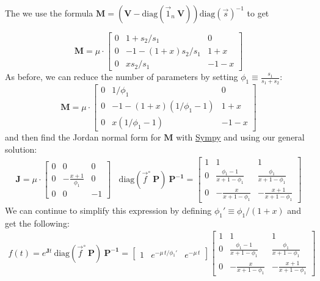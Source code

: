 \documentclass{article}
\newcommand{\finit}{\ensuremath{\vec{f}^\circ}}
\begin{document}
The we use the formula $\mathbf{M} = \left(\mathbf{V} - \text{diag}(\vec{1}_n~\mathbf{V})\right) \text{diag}(\vec{s})^{-1}$ to get

\[
\mathbf{M} = \mu \cdot 
    \begin{bmatrix}
        0 & 1 + s_2/s_1 & 0  \\
        0 & - 1 - (1+x) s_2 / s_1 & 1+x \\
        0 & x s_2 / s_1 & -1-x
    \end{bmatrix}
\]
As before, we can reduce the number of parameters by setting $\phi_1 \equiv \frac{s_1}{s_1+s_2}$:
\[
\mathbf{M} = \mu \cdot 
    \begin{bmatrix}
        0 & 1/\phi_1 & 0  \\
        0 & - 1 - (1+x)(1/\phi_1-1) & 1+x \\
        0 &  x (1/\phi_1-1) & -1-x
    \end{bmatrix}
\]
and then find the Jordan normal form for $\mathbf{M}$ with \href{https://www.sympy.org/}{Sympy} and using our general solution:
\begin{eqnarray}
\mathbf{J} = \mu \cdot
  \begin{bmatrix}
    0 & 0 & 0 \\
    0 & -\frac{x+1}{\phi_1} & 0 \\
    0 & 0 & -1
\end{bmatrix}
~~~~
\text{diag}\left(\finit~\mathbf{P}\right)~\mathbf{P^{-1}} =
    \begin{bmatrix}
        1 & 1 & 1 \\
        0 & \frac{\phi_1 - 1}{x + 1 - \phi_1} & \frac{\phi_1}{x + 1 - \phi_1} \\
        0 & -\frac{x}{x + 1 - \phi_1} & -\frac{x+1}{x + 1 - \phi_1} 
    \end{bmatrix}
\end{eqnarray}
We can continue to simplify this expression by defining $\phi_1' \equiv \phi_1/(1+x)$ and get the following:
\begin{eqnarray}
    f(t) = e^{\mathbf{J}t}~\text{diag}\left(\finit~\mathbf{P}\right)~\mathbf{P^{-1}} = 
    \begin{bmatrix}
		1 & e^{-\mu\,t / \phi_1'} & e^{-\mu\,t}
	\end{bmatrix}
    \begin{bmatrix}
		1 & 1 & 1 \\
		0 & \frac{\phi_1 - 1}{x + 1 - \phi_1} & \frac{\phi_1}{x + 1 - \phi_1} \\
		0 & -\frac{x}{x + 1 - \phi_1} & -\frac{x+1}{x + 1 - \phi_1} 
	\end{bmatrix}
\end{eqnarray}
\end{document}
